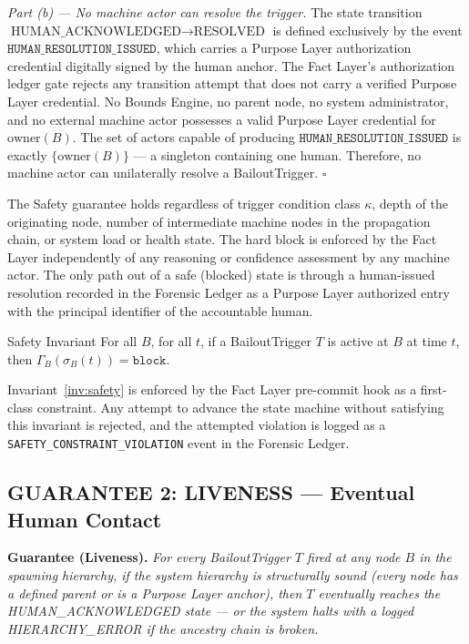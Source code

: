 \medskip

\noindent\textit{Part (b) — No machine actor can resolve the trigger.}
The state transition $\text{HUMAN\_ACKNOWLEDGED} \rightarrow \text{RESOLVED}$ is defined exclusively by the event $\texttt{HUMAN\_RESOLUTION\_ISSUED}$, which carries a Purpose Layer authorization credential digitally signed by the human anchor. The Fact Layer's authorization ledger gate rejects any transition attempt that does not carry a verified Purpose Layer credential. No Bounds Engine, no parent node, no system administrator, and no external machine actor possesses a valid Purpose Layer credential for $\text{owner}(B)$. The set of actors capable of producing $\texttt{HUMAN\_RESOLUTION\_ISSUED}$ is exactly $\{\text{owner}(B)\}$ — a singleton containing one human. Therefore, no machine actor can unilaterally resolve a BailoutTrigger. $\square$

\bigskip

The Safety guarantee holds regardless of trigger condition class $\kappa$, depth of the originating node, number of intermediate machine nodes in the propagation chain, or system load or health state. The hard block is enforced by the Fact Layer independently of any reasoning or confidence assessment by any machine actor. The only path out of a safe (blocked) state is through a human-issued resolution recorded in the Forensic Ledger as a Purpose Layer authorized entry with the principal identifier of the accountable human.

\begin{invariant}{Safety Invariant}
\label{inv:safety}
For all $B$, for all $t$, if a BailoutTrigger $T$ is active at $B$ at time $t$, then $\Gamma_B(\sigma_B(t)) = \texttt{block}$.
\end{invariant}

Invariant~\ref{inv:safety} is enforced by the Fact Layer pre-commit hook as a first-class constraint. Any attempt to advance the state machine without satisfying this invariant is rejected, and the attempted violation is logged as a \texttt{SAFETY\_CONSTRAINT\_VIOLATION} event in the Forensic Ledger.

\subsection{GUARANTEE 2: LIVENESS — Eventual Human Contact}
\bigskip

\begin{minipage}{\linewidth}
\textbf{Guarantee (Liveness).} \textit{For every BailoutTrigger $T$ fired at any node $B$ in the spawning hierarchy, if the system hierarchy is structurally sound (every node has a defined parent or is a Purpose Layer anchor), then $T$ eventually reaches the HUMAN\_ACKNOWLEDGED state — or the system halts with a logged HIERARCHY\_ERROR if the ancestry chain is broken.}
\end{minipage}

